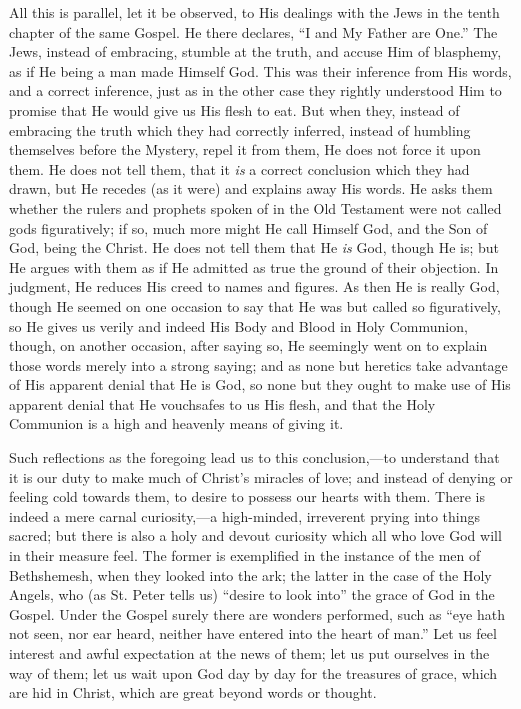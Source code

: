 All this is parallel, let it be observed, to His dealings with the
Jews in the tenth chapter of the same Gospel. He there declares,
``I and My Father are One.'' The Jews, instead of embracing,
stumble at the truth, and accuse Him of blasphemy, as if He being a
man made Himself God. This was their inference from His words, and a
correct inference, just as in the other case they rightly understood
Him to promise that He would give us His flesh to eat. But when they,
instead of embracing the truth which they had correctly inferred,
instead of humbling themselves before the Mystery, repel it from them,
He does not force it upon them. He does not tell them, that it \emph{is}
a correct conclusion which they had drawn, but He recedes (as it were)
and explains away His words. He asks them whether the rulers and
prophets spoken of in the Old Testament were not called gods
figuratively; if so, much more might He call Himself God, and the Son
of God, being the Christ. He does not tell them that He \emph{is} God,
though He is; but He argues with them as if He admitted as true the
ground of their objection. In judgment, He reduces His creed to names
and figures. As then He is really God, though He seemed on one
occasion to say that He was but called so figuratively, so He gives us
verily and indeed His Body and Blood in Holy Communion, though, on
another occasion, after saying so, He seemingly went on to explain
those words merely into a strong saying; and as none but heretics take
advantage of His apparent denial that He is God, so none but they
ought to make use of His apparent denial that He vouchsafes to us His
flesh, and that the Holy Communion is a high and heavenly means of
giving it.

Such reflections as the foregoing lead us to this conclusion,—to
understand that it is our duty to make much of Christ's miracles of
love; and instead of denying or feeling cold towards them, to desire
to possess our hearts with them. There is indeed a mere carnal
curiosity,—a high-minded, irreverent prying into things sacred; but
there is also a holy and devout curiosity which all who love God will
in their measure feel. The former is exemplified in the instance of
the men of Bethshemesh, when they looked into the ark; the latter in
the case of the Holy Angels, who (as St. Peter tells us) ``desire
to look into'' the grace of God in the Gospel. Under the Gospel
surely there are wonders performed, such as ``eye hath not seen,
nor ear heard, neither have entered into the heart of man.'' Let
us feel interest and awful expectation at the news of them; let us put
ourselves in the way of them; let us wait upon God day by day for the
treasures of grace, which are hid in Christ, which are great beyond
words or thought.

